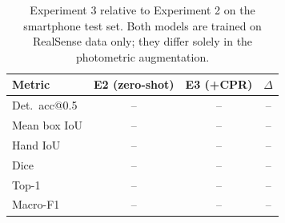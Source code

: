 \begin{table}[t]
\centering
\caption{Experiment 3 relative to Experiment 2 on the smartphone test set. Both models are trained on RealSense data only; they differ solely in the photometric augmentation.}
\label{tab:gain}
\begin{tabular}{lccc}
\toprule
Metric & E2 (zero-shot) & E3 (+CPR) & $\Delta$ \\
\midrule
Det.\ acc@0.5 & -- & -- & -- \\
Mean box IoU & -- & -- & -- \\
Hand IoU & -- & -- & -- \\
Dice & -- & -- & -- \\
Top-1 & -- & -- & -- \\
Macro-F1 & -- & -- & -- \\
\bottomrule
\end{tabular}
\end{table}
